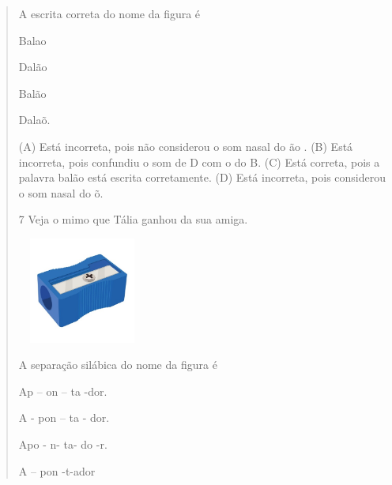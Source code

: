 \begin{verse}
A escrita correta do nome da figura é

\begin{escolha}
\item Balao

\item Dalão

\item Balão

\item Dalaõ.
\end{escolha}


(A) Está incorreta, pois não considerou o som nasal do ão .
(B) Está incorreta, pois confundiu o som de D com o do B.
(C) Está correta, pois a palavra balão está escrita corretamente.
(D) Está incorreta, pois considerou o som nasal do õ.

\num{7} Veja o mimo que Tália ganhou da sua amiga.

\includegraphics[width=1.67273in,height=1.37251in]{media/image168.jpeg}


A separação silábica do nome da figura é

\begin{escolha}
\item Ap -- on -- ta -dor.

\item A - pon -- ta - dor.

\item Apo - n- ta- do -r.

\item A -- pon -t-ador
\end{escolha}



\end{verse}
